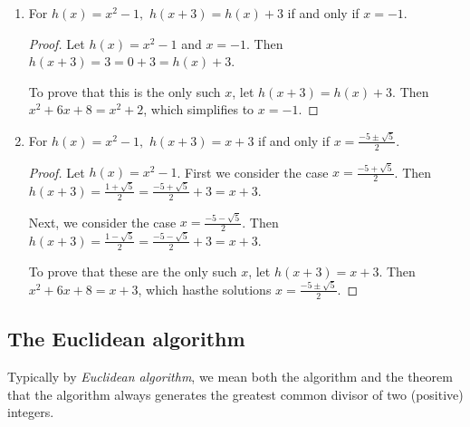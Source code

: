 \documentclass{ximera}
\begin{document}
\begin{example}
\begin{enumerate}
		\begin{solution}
			
			\begin{enumerate}
				\item For $h(x)=x^2-1,$ $h(x+3)=h(x)+3$ if and only if $x=-1$.
				\begin{proof}
					Let $h(x)=x^2-1$ and $x=-1$. Then $h(x+3)=3=0+3=h(x)+3$.

					To prove that this is the only such $x$, let $h(x+3)=h(x)+3$. Then $x^2+6x+8=x^2+2$, which simplifies to $x=-1$.
				\end{proof}
				\item For $h(x)=x^2-1,$ $h(x+3)=x+3$ if and only if $x=\frac{-5\pm\sqrt{5}}{2}$.
				\begin{proof}
					Let $h(x)=x^2-1$. First we consider the case $x=\frac{-5+\sqrt{5}}{2}$. Then $h(x+3)=\frac{1+\sqrt{5}}{2}=
					\frac{-5+\sqrt{5}}{2}+3=x+3$. 
					
					Next, we consider the case $x=\frac{-5-\sqrt{5}}{2}$. Then $h(x+3)=\frac{1-\sqrt{5}}{2}=
					\frac{-5-\sqrt{5}}{2}+3=x+3$.

					To prove that these are the only such $x$, let $h(x+3)=x+3$. Then $x^2+6x+8=x+3$, which  hasthe solutions  $x=\frac{-5\pm\sqrt{5}}{2}$.
				\end{proof}
			\end{enumerate}
		\end{solution}
	\end{enumerate}
\end{example}

\subsection{The Euclidean algorithm}

Typically by \emph{Euclidean algorithm}, we mean  both the algorithm and the theorem that the algorithm always generates the greatest common divisor of two (positive) integers.
\end{document}
